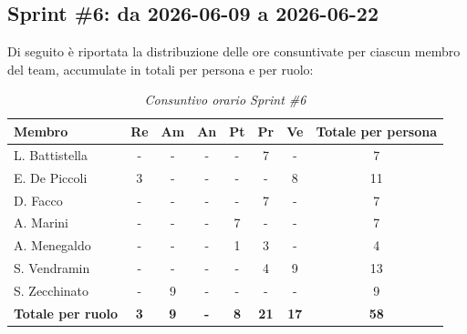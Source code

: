 ﻿\documentclass[a4paper, 10pt, colorlinks=true, linkcolor=black, urlcolor=blue, citecolor=blue, hidelinks]{article}
\renewcommand{\arraystretch}{1.2}
\begin{document}
\subsection{Sprint \#6: da 2026-06-09 a 2026-06-22}
Di seguito è riportata la distribuzione delle ore consuntivate per ciascun membro del team, accumulate in totali per persona e per ruolo:

\begin{table}[H]
    \centering
    \renewcommand{\arraystretch}{1.4}
    \begin{tabular}{|l|c|c|c|c|c|c|c|}
        \hline
        \rowcolor{bluBitless!15}
        \textbf{Membro} & \textbf{Re} & \textbf{Am} & \textbf{An} & \textbf{Pt} & \textbf{Pr} & \textbf{Ve} & \textbf{Totale per persona} \\
        \hline
        L. Battistella & - & - & - & - & 7 & - & 7 \\ \hline
        E. De Piccoli & 3 & - & - & - & - & 8 & 11 \\ \hline
        D. Facco & - & - & - & - & 7 & - & 7 \\ \hline
        A. Marini & - & - & - & 7 & - & - & 7 \\ \hline
        A. Menegaldo & - & - & - & 1 & 3 & - & 4 \\ \hline
        S. Vendramin & - & - & - & - & 4 & 9 & 13 \\ \hline
        S. Zecchinato & - & 9 & - & - & - & - & 9 \\ \hline
        \rowcolor{bluBitless!8}
        \textbf{Totale per ruolo} & \textbf{3} & \textbf{9} & \textbf{-} & \textbf{8} & \textbf{21} & \textbf{17} & \textbf{58} \\
        \hline
    \end{tabular}
    \caption{\textit{Consuntivo orario Sprint \#6}}
\end{table}
\end{document}

